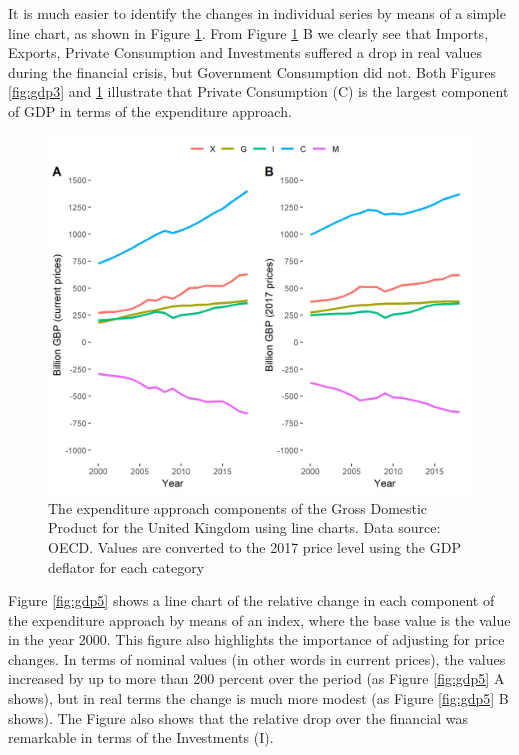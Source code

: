 \documentclass[]{book}
\begin{document}
It is much easier to identify the changes in individual series by means of a simple line chart, as shown in Figure \ref{fig:gdp4}. From Figure \ref{fig:gdp4} B we clearly see that Imports, Exports, Private Consumption and Investments suffered a drop in real values during the financial crisis, but Government Consumption did not. Both Figures \ref{fig:gdp3} and \ref{fig:gdp4} illustrate that Private Consumption (C) is the largest component of GDP in terms of the expenditure approach.

\begin{figure}

{\centering \includegraphics[width=0.9\linewidth]{_resources/chapter_gdp/fig2} 

}

\caption{The expenditure approach components of the Gross Domestic Product for the United Kingdom using line charts. Data source: OECD. Values are converted to the 2017 price level using the GDP deflator for each category}\label{fig:gdp4}
\end{figure}

Figure \ref{fig:gdp5} shows a line chart of the relative change in each component of the expenditure approach by means of an index, where the base value is the value in the year 2000. This figure also highlights the importance of adjusting for price changes. In terms of nominal values (in other words in current prices), the values increased by up to more than 200 percent over the period (as Figure \ref{fig:gdp5} A shows), but in real terms the change is much more modest (as Figure \ref{fig:gdp5} B shows). The Figure also shows that the relative drop over the financial was remarkable in terms of the Investments (I).
\end{document}
